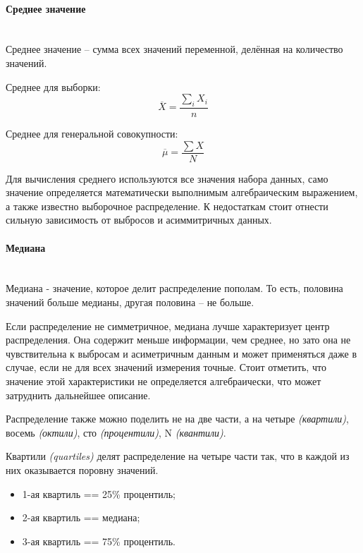 \paragraph{Среднее значение} \mbox{} \\

Среднее значение -- сумма всех значений переменной, делённая на количество значений. 

Среднее для выборки:
\begin{equation}
	\overline{X} = \frac{\sum\limits_i X_i}{n}
\end{equation}

Среднее для генеральной совокупности:
\begin{equation}
	\overline{\mu} = \frac{\sum X}{N}
\end{equation}

Для вычисления среднего используются все значения набора данных, само значение определяется математически выполнимым алгебраическим выражением, а также известно выборочное распределение. К недостаткам стоит отнести сильную зависимость от выбросов и асиммитричных данных.

\paragraph{Медиана} \mbox{} \\

Медиана - значение, которое делит распределение пополам. То есть, половина значений больше медианы, другая половина -- не больше.

Если распределение не симметричное, медиана лучше характеризует центр распределения. Она содержит меньше информации, чем среднее, но зато она не чувствительна к выбросам и асиметричным данным и может применяться даже в случае, если не для всех значений измерения точные. Стоит отметить, что значение этой характеристики не определяется алгебраически, что может затруднить дальнейшее описание.

Распределение также можно поделить не на две части, а на четыре \textit{(квартили)}, восемь \textit{(октили)}, сто \textit{(процентили)}, N \textit{(квантили)}.

Квартили \textit{(quartiles)} делят распределение на четыре части так, что в каждой из них оказывается поровну значений.

\begin{itemize}
	\item 1-ая квартиль == 25\% процентиль;
	\item 2-ая квартиль == медиана;
	\item 3-ая квартиль == 75\% процентиль.
\end{itemize}

